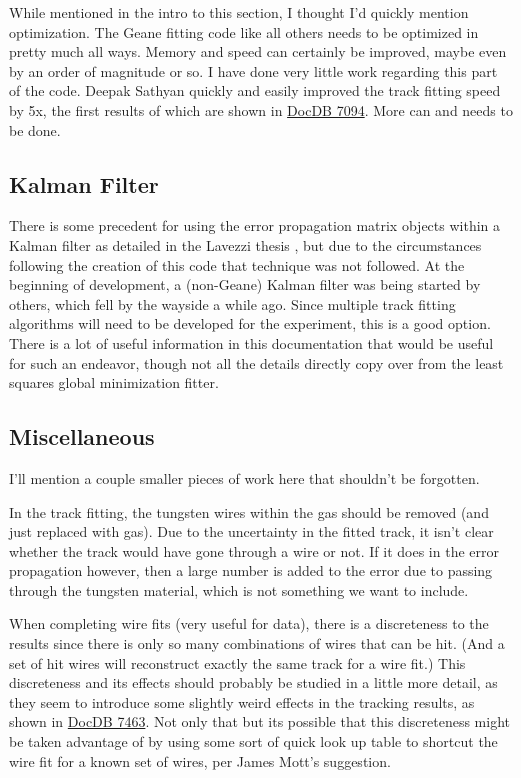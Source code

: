 		While mentioned in the intro to this section, I thought I'd quickly mention optimization. The Geane fitting code like all others needs to be optimized in pretty much all ways. Memory and speed can certainly be improved, maybe even by an order of magnitude or so. I have done very little work regarding this part of the code. Deepak Sathyan quickly and easily improved the track fitting speed by 5x, the first results of which are shown in \href{https://gm2-docdb.fnal.gov/cgi-bin/private/ShowDocument?docid=7094}{DocDB 7094}. More can and needs to be done.

	\subsection{Kalman Filter}

    	There is some precedent for using the error propagation matrix objects within a Kalman filter as detailed in the Lavezzi thesis \cite{Lavezzi}, but due to the circumstances following the creation of this code that technique was not followed. At the beginning of development, a (non-Geane) Kalman filter was being started by others, which fell by the wayside a while ago. Since multiple track fitting algorithms will need to be developed for the experiment, this is a good option. There is a lot of useful information in this documentation that would be useful for such an endeavor, though not all the details directly copy over from the least squares global minimization fitter.

	\subsection{Miscellaneous}

		I'll mention a couple smaller pieces of work here that shouldn't be forgotten.

		In the track fitting, the tungsten wires within the gas should be removed (and just replaced with gas). Due to the uncertainty in the fitted track, it isn't clear whether the track would have gone through a wire or not. If it does in the error propagation however, then a large number is added to the error due to passing through the tungsten material, which is not something we want to include.

		When completing wire fits (very useful for data), there is a discreteness to the results since there is only so many combinations of wires that can be hit. (And a set of hit wires will reconstruct exactly the same track for a wire fit.)  This discreteness and its effects should probably be studied in a little more detail, as they seem to introduce some slightly weird effects in the tracking results, as shown in \href{https://gm2-docdb.fnal.gov/cgi-bin/private/ShowDocument?docid=7463}{DocDB 7463}. Not only that but its possible that this discreteness might be taken advantage of by using some sort of quick look up table to shortcut the wire fit for a known set of wires, per James Mott's suggestion.


